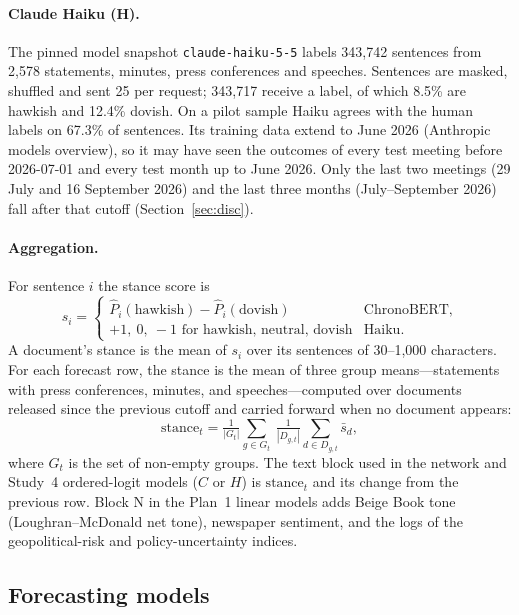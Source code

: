 \documentclass[11pt]{article}
\begin{document}
\paragraph{Claude Haiku (H).}
The pinned model snapshot \texttt{claude-haiku-5-5} labels 343,742 sentences from 2,578 statements, minutes,
press conferences and speeches. Sentences are masked, shuffled and sent 25 per request; 343,717 receive a label,
of which 8.5\% are hawkish and 12.4\% dovish. On a pilot sample Haiku agrees with the human labels on 67.3\% of
sentences. Its training data extend to June 2026 (Anthropic models overview), so it may have seen the outcomes of
every test meeting before 2026-07-01 and every test month up to June 2026. Only the last two meetings
(29 July and 16 September 2026) and the last three months (July--September 2026) fall after that cutoff
(Section~\ref{sec:disc}).

\paragraph{Aggregation.}
For sentence $i$ the stance score is
\begin{equation}
  s_i = \begin{cases}
    \hat P_i(\text{hawkish}) - \hat P_i(\text{dovish}) & \text{ChronoBERT},\\
    +1,\ 0,\ -1 \text{ for hawkish, neutral, dovish} & \text{Haiku}.
  \end{cases}
\end{equation}
A document's stance is the mean of $s_i$ over its sentences of 30--1,000 characters. For each forecast row, the
stance is the mean of three group means---statements with press conferences, minutes, and speeches---computed over
documents released since the previous cutoff and carried forward when no document appears:
\begin{equation}
  \text{stance}_t = \tfrac{1}{|G_t|}\sum_{g\in G_t}\ \tfrac{1}{|D_{g,t}|}\sum_{d\in D_{g,t}} \bar s_d,
\end{equation}
where $G_t$ is the set of non-empty groups. The text block used in the network and Study~4 ordered-logit models
($C$ or $H$) is $\text{stance}_t$ and its change from the previous row. Block N in the Plan~1 linear models adds
Beige Book tone (Loughran--McDonald net tone), newspaper sentiment, and the logs of the geopolitical-risk and
policy-uncertainty indices.

\subsection{Forecasting models}
\end{document}
